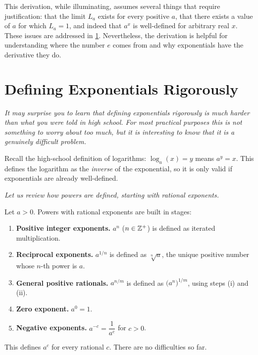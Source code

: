 \begin{remark}[Warning]
This derivation, while illuminating, assumes several things that require justification: that the limit $L_{a}$ exists for every positive $a$, that there exists a value of $a$ for which $L_{a} = 1$, and indeed that $a^{x}$ is well-defined for arbitrary real $x$.  These issues are addressed in \cref{sec:4.6}.  Nevertheless, the derivation is helpful for understanding where the number $e$ comes from and why exponentials have the derivative they do.
\end{remark}

\section{Defining Exponentials Rigorously}
\label{sec:4.6}

\textit{It may surprise you to learn that defining exponentials rigorously is much harder than what you were told in high school.  For most practical purposes this is not something to worry about too much, but it is interesting to know that it is a genuinely difficult problem.}

Recall the high-school definition of logarithms: $\log_{a}(x) = y$ means $a^{y} = x$.  This defines the logarithm as the \emph{inverse} of the exponential, so it is only valid if exponentials are already well-defined.

\textit{Let us review how powers are defined, starting with rational exponents.}

\begin{remark}
Let $a > 0$.  Powers with rational exponents are built in stages:
\begin{enumerate}[label=(\roman*)]
  \item \textbf{Positive integer exponents.} $a^{n}$ ($n \in \mathbb{Z}^{+}$) is defined as iterated multiplication.
  \item \textbf{Reciprocal exponents.} $a^{1/n}$ is defined as $\sqrt[n]{a}$, the unique positive number whose $n$-th power is $a$.
  \item \textbf{General positive rationals.} $a^{n/m}$ is defined as $\bigl(a^{n}\bigr)^{1/m}$, using steps (i) and (ii).
  \item \textbf{Zero exponent.} $a^{0} = 1$.
  \item \textbf{Negative exponents.} $a^{-c} = \dfrac{1}{a^{c}}$ for $c > 0$.
\end{enumerate}
This defines $a^{c}$ for every rational $c$.  There are no difficulties so far.
\end{remark}

